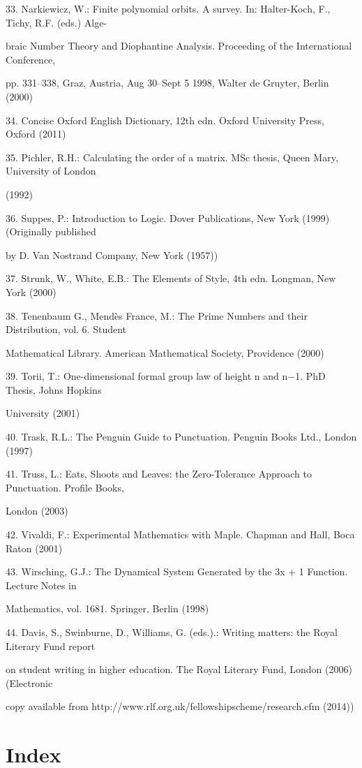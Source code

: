\documentclass[11pt]{article}
\theoremstyle{plain}
\theoremstyle{definition}
\begin{document}
33. Narkiewicz, W.: Finite polynomial orbits. A survey. In: Halter-Koch, F., Tichy, R.F. (eds.) Alge-

braic Number Theory and Diophantine Analysis. Proceeding of the International Conference,

pp. 331--338, Graz, Austria, Aug 30--Sept 5 1998, Walter de Gruyter, Berlin (2000)

34. Concise Oxford English Dictionary, 12th edn. Oxford University Press, Oxford (2011)

35. Pichler, R.H.: Calculating the order of a matrix. MSc thesis, Queen Mary, University of London

(1992)

36. Suppes, P.: Introduction to Logic. Dover Publications, New York (1999) (Originally published

by D. Van Nostrand Company, New York (1957))

37. Strunk, W., White, E.B.: The Elements of Style, 4th edn. Longman, New York (2000)

38. Tenenbaum G., Mendès France, M.: The Prime Numbers and their Distribution, vol. 6. Student

Mathematical Library. American Mathematical Society, Providence (2000)

39. Torii, T.: One-dimensional formal group law of height n and n$-$1. PhD Thesis, Johns Hopkins

University (2001)

40. Trask, R.L.: The Penguin Guide to Punctuation. Penguin Books Ltd., London (1997)

41. Truss, L.: Eats, Shoots and Leaves: the Zero-Tolerance Approach to Punctuation. Profile Books,

London (2003)

42. Vivaldi, F.: Experimental Mathematics with Maple. Chapman and Hall, Boca Raton (2001)

43. Wirsching, G.J.: The Dynamical System Generated by the 3x + 1 Function. Lecture Notes in

Mathematics, vol. 1681. Springer, Berlin (1998)

44. Davis, S., Swinburne, D., Williams, G. (eds.).: Writing matters: the Royal Literary Fund report

on student writing in higher education. The Royal Literary Fund, London (2006) (Electronic

copy available from http://www.rlf.org.uk/fellowshipscheme/research.cfm (2014))

\section{Index}
\end{document}
